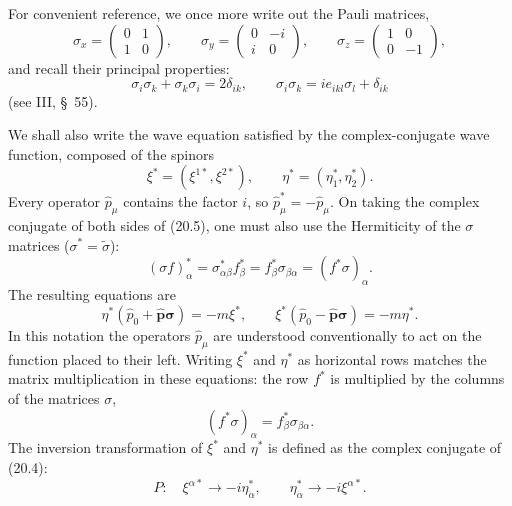 For convenient reference, we once more write out the Pauli matrices,
\begin{equation}
\sigma_x=\begin{pmatrix}0&1\\1&0\end{pmatrix},\qquad
\sigma_y=\begin{pmatrix}0&-i\\i&0\end{pmatrix},\qquad
\sigma_z=\begin{pmatrix}1&0\\0&-1\end{pmatrix},
\tag{20.8}
\end{equation}
and recall their principal properties:
\begin{equation}
\sigma_i\sigma_k+\sigma_k\sigma_i=2\delta_{ik},
\qquad
\sigma_i\sigma_k=i e_{ikl}\sigma_l+\delta_{ik}
\tag{20.9}
\end{equation}
(see III, \S~55).

We shall also write the wave equation satisfied by the complex-conjugate wave function, composed of the spinors
\begin{equation}
\xi^*=\left(\xi^{1*},\xi^{2*}\right),
\qquad
\eta^*=\left(\eta^*_{\dot1},\eta^*_{\dot2}\right).
\tag{20.10}
\end{equation}
Every operator $\widehat p_\mu$ contains the factor $i$, so $\widehat p_\mu^*=-\widehat p_\mu$. On taking the complex conjugate of both sides of (20.5), one must also use the Hermiticity of the $\sigma$ matrices ($\sigma^*=\widetilde\sigma$):
\[
(\sigma f)^*_\alpha=\sigma^*_{\alpha\beta}f^*_\beta
=f^*_\beta\sigma_{\beta\alpha}=(f^*\sigma)_\alpha.
\]
The resulting equations are
\begin{equation}
\eta^*(\widehat p_0+\widehat{\mathbf p}\boldsymbol\sigma)=-m\xi^*,
\qquad
\xi^*(\widehat p_0-\widehat{\mathbf p}\boldsymbol\sigma)=-m\eta^*.
\tag{20.11}
\end{equation}
In this notation the operators $\widehat p_\mu$ are understood conventionally to act on the function placed to their left. Writing $\xi^*$ and $\eta^*$ as horizontal rows matches the matrix multiplication in these equations: the row $f^*$ is multiplied by the columns of the matrices $\sigma$,
\begin{equation}
(f^*\sigma)_\alpha=f^*_\beta\sigma_{\beta\alpha}.
\tag{20.12}
\end{equation}
The inversion transformation of $\xi^*$ and $\eta^*$ is defined as the complex conjugate of (20.4):
\begin{equation}
P:\quad \xi^{\alpha*}\to-i\eta^*_{\dot\alpha},
\qquad
\eta^*_{\dot\alpha}\to-i\xi^{\alpha*}.
\tag{20.13}
\end{equation}
